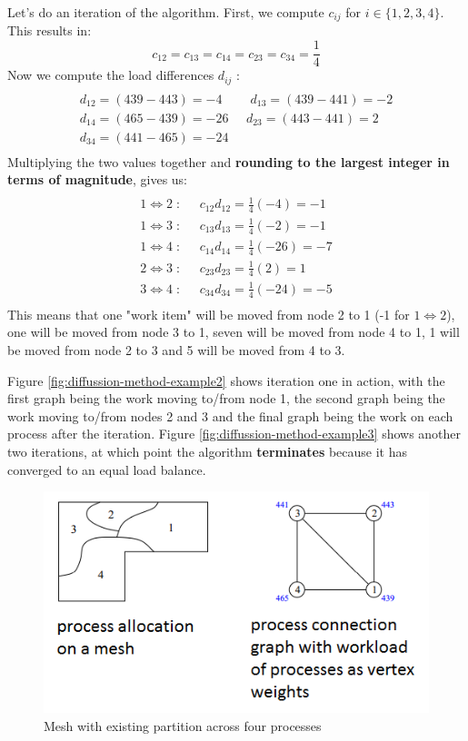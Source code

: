 \documentclass{article}
\begin{document}
Let's do an iteration of the algorithm. First, we compute $c_{ij}$ for $i \in \lbrace 1, 2, 3, 4 \rbrace$. This results in:
\begin{equation}
	c_{12} = c_{13} = c_{14} = c_{23} = c_{34} = \frac{1}{4}
\end{equation}
Now we compute the load differences $d_{ij}$ :
\begin{multline} \\
	d_{12} = (439 - 443) = -4 \;\;\;\;\;\;\;\; d_{13} = (439 - 441) = -2 \\
	d_{14} = (465 - 439) = -26 \;\;\;\;\; d_{23} = (443 - 441) = 2 \\
	d_{34} = (441 - 465) = -24 \\
\end{multline}
Multiplying the two values together and \textbf{rounding to the largest integer in terms of magnitude}, gives us:
\begin{multline} \\
	1 \iff 2 \; : \;\;\;\;\; c_{12}d_{12} = \frac{1}{4}(-4) = -1 \\
	1 \iff 3 \; : \;\;\;\;\; c_{13}d_{13} = \frac{1}{4}(-2) = -1 \\
	1 \iff 4 \; : \;\;\;\;\; c_{14}d_{14} = \frac{1}{4}(-26) = -7 \\
	2 \iff 3 \; : \;\;\;\;\; c_{23}d_{23} = \frac{1}{4}(2) = 1 \\
	3 \iff 4 \; : \;\;\;\;\; c_{34}d_{34} = \frac{1}{4}(-24) = -5 \\
\end{multline}
This means that one "work item" will be moved from node 2 to 1 (-1 for $1 \iff 2$), one will be moved from node 3 to 1, seven will be moved from node 4 to 1, 1 will be moved from node 2 to 3 and 5 will be moved from 4 to 3.

Figure \ref{fig:diffussion-method-example2} shows iteration one in action, with the first graph being the work moving to/from node 1, the second graph being the work moving to/from nodes 2 and 3 and the final graph being the work on each process after the iteration. Figure \ref{fig:diffussion-method-example3} shows another two iterations, at which point the algorithm \textbf{terminates} because it has converged to an equal load balance.

\begin{figure}[H]
	\centering
	\includegraphics[scale=0.5]{figures/diffusion-method-example1.png}
	\caption{Mesh with existing partition across four processes}
	\label{fig:diffussion-method-example}
\end{figure}
\end{document}
